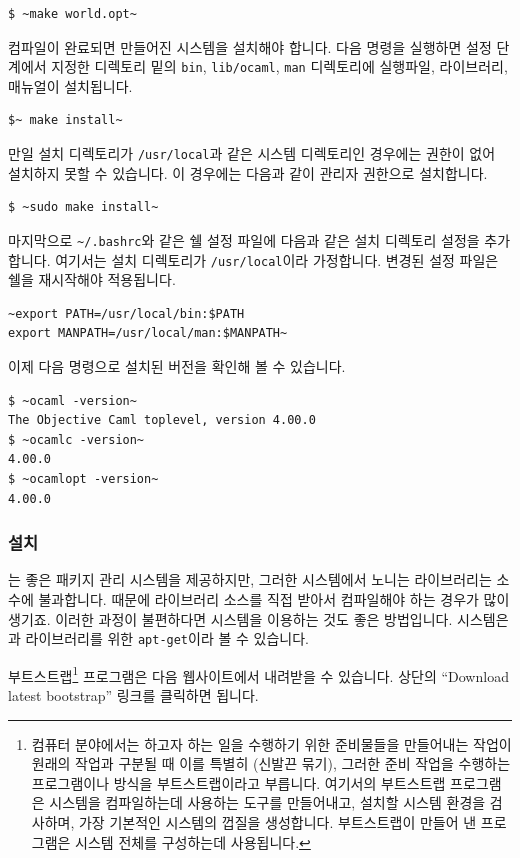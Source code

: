 \begin{lstlisting}
$ ~make world.opt~
\end{lstlisting}

컴파일이 완료되면 만들어진 \OCAML{} 시스템을 설치해야 합니다. 다음 명령을
실행하면 설정 단계에서 지정한 디렉토리 밑의 \texttt{bin}, \texttt{lib/ocaml},
\texttt{man} 디렉토리에 실행파일, 라이브러리, 매뉴얼이 설치됩니다.

\begin{lstlisting}
$~ make install~
\end{lstlisting}

만일 설치 디렉토리가 \texttt{/usr/local}과 같은 시스템 디렉토리인
경우에는 권한이 없어 설치하지 못할 수 있습니다. 이 경우에는 다음과 같이 관리자
권한으로 설치합니다.

\begin{lstlisting}
$ ~sudo make install~
\end{lstlisting}

마지막으로 \texttt{\~{}/.bashrc}와 같은 쉘 설정 파일에 다음과 같은 설치 디렉토리
설정을 추가합니다. 여기서는 설치 디렉토리가 \texttt{/usr/local}이라
가정합니다. 변경된 설정 파일은 쉘을 재시작해야 적용됩니다.

\begin{lstlisting}
~export PATH=/usr/local/bin:$PATH
export MANPATH=/usr/local/man:$MANPATH~
\end{lstlisting}

이제 다음 명령으로 설치된 \OCAML{} 버전을 확인해 볼 수 있습니다.

\begin{lstlisting}
$ ~ocaml -version~
The Objective Caml toplevel, version 4.00.0
$ ~ocamlc -version~
4.00.0
$ ~ocamlopt -version~
4.00.0
\end{lstlisting}


\subsubsection{\GODI{} 설치}

\UBUNTU{}는 좋은 패키지 관리 시스템을 제공하지만, 그러한 시스템에서 노니는
\OCAML{} 라이브러리는 소수에 불과합니다. 때문에 라이브러리 소스를 직접
받아서 컴파일해야 하는 경우가 많이 생기죠. 이러한 과정이 불편하다면 \GODI{}
시스템을 이용하는 것도 좋은 방법입니다. \GODI{} 시스템은 \OCAML{}과 \OCAML{}
라이브러리를 위한 \texttt{apt-get}이라 볼 수 있습니다.

\GODI{} 부트스트랩\footnote{컴퓨터 분야에서는 하고자 하는 일을 수행하기 위한
  준비물들을 만들어내는 작업이 원래의 작업과 구분될 때 이를 특별히
  (신발끈 묶기), 그러한 준비 작업을 수행하는
  프로그램이나 방식을 부트스트랩이라고 부릅니다. 여기서의 \GODI{} 부트스트랩
  프로그램은 시스템을 컴파일하는데 사용하는 도구를 만들어내고, 설치할
  시스템 환경을 검사하며, 가장 기본적인 \GODI{} 시스템의 껍질을 생성합니다.
  부트스트랩이 만들어 낸 프로그램은 \GODI{} 시스템 전체를 구성하는데
  사용됩니다.} 프로그램은 다음 웹사이트에서 내려받을 수
있습니다. 상단의 ``Download latest bootstrap'' 링크를 클릭하면 됩니다.

